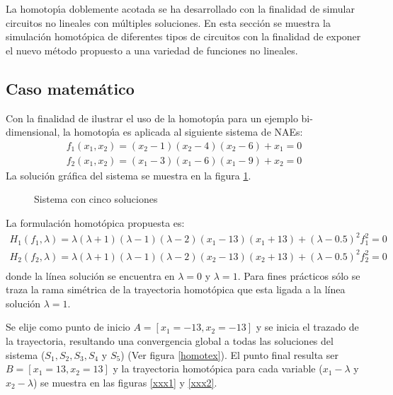 \documentclass[conference,letterpaper,onecolumn]{IEEEtran}
\begin{document}
{La homotop\'{\i}a doblemente acotada se ha desarrollado con la finalidad
de simular circuitos no lineales con m\'ultiples soluciones.
En esta secci\'on se muestra la simulaci\'on homot\'opica de diferentes tipos de circuitos con la finalidad de exponer
el nuevo m\'etodo propuesto a una variedad de funciones no lineales.


\subsection{Caso matem\'atico}

Con la finalidad de ilustrar el uso de la homotop\'{\i}a para un ejemplo
bi-dimensional, la homotop\'{\i}a es aplicada
al siguiente sistema de NAEs:
\begin{displaymath}
\begin{array}{c}
f_1(x_1,x_2)=(x_2-1)(x_2-4)(x_2-6)+x_1=0\\
f_2(x_1,x_2)=(x_1-3)(x_1-6)(x_1-9)+x_2=0
\end{array}
\end{displaymath}
La soluci\'on gr\'afica del sistema se muestra en la figura \ref{9sol}.

\begin{figure}[hbtp]
\centerline{
\epsfxsize=80mm
}
\caption{Sistema con cinco soluciones}
\label{9sol}
\end{figure}


La formulaci\'on homot\'opica propuesta es:
\begin{displaymath}
\begin{array}{c}
H_1(f_1,\lambda)=\lambda(\lambda+1)(\lambda-1)(\lambda-2)(x_1-13)(x_1+13)+(\lambda-0.5)^2 f_1^2=0\\
H_2(f_2,\lambda)=\lambda(\lambda+1)(\lambda-1)(\lambda-2)(x_2-13)(x_2+13)+(\lambda-0.5)^2 f_2^2=0\\
\end{array}
\end{displaymath}
donde la l{\'i}nea soluci\'on se encuentra en $\lambda=0$ y $\lambda=1$. Para fines pr\'acticos s\'olo se traza la rama sim\'etrica
de la trayectoria homot\'opica que esta ligada a la l{\'i}nea soluci\'on $\lambda=1$.

Se elije como punto de inicio $A=[x_1=-13,x_2=-13]$ y se inicia el trazado de la trayectoria, resultando una convergencia global a todas
las soluciones del sistema ($S_1,S_2,S_3,S_4$ y $S_5$) (Ver figura \ref{homotex}). El punto final resulta ser $B=[x_1=13, x_2=13]$ y la trayectoria homot\'opica  para
cada variable ($x_1-\lambda$ y $x_2-\lambda$) se muestra en las figuras \ref{xxx1} y \ref{xxx2}.

}
\end{document}
